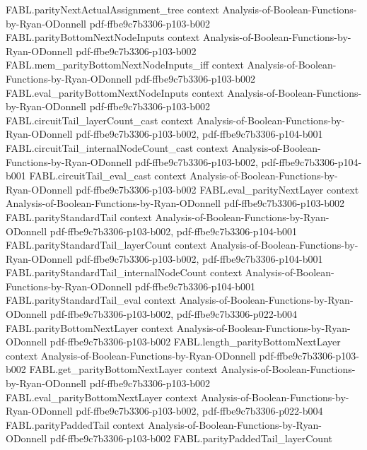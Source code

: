 \begin{theorem}
  {FABL.parityNextActualAssignment_tree}
  {context}
  {Analysis-of-Boolean-Functions-by-Ryan-ODonnell}
  {pdf-ffbe9c7b3306-p103-b002}
\proofstep
  {FABL.parityBottomNextNodeInputs}
  {context}
  {Analysis-of-Boolean-Functions-by-Ryan-ODonnell}
  {pdf-ffbe9c7b3306-p103-b002}
\proofstep
  {FABL.mem_parityBottomNextNodeInputs_iff}
  {context}
  {Analysis-of-Boolean-Functions-by-Ryan-ODonnell}
  {pdf-ffbe9c7b3306-p103-b002}
\proofstep
  {FABL.eval_parityBottomNextNodeInputs}
  {context}
  {Analysis-of-Boolean-Functions-by-Ryan-ODonnell}
  {pdf-ffbe9c7b3306-p103-b002}
\proofstep
  {FABL.circuitTail_layerCount_cast}
  {context}
  {Analysis-of-Boolean-Functions-by-Ryan-ODonnell}
  {pdf-ffbe9c7b3306-p103-b002,
    pdf-ffbe9c7b3306-p104-b001}
\proofstep
  {FABL.circuitTail_internalNodeCount_cast}
  {context}
  {Analysis-of-Boolean-Functions-by-Ryan-ODonnell}
  {pdf-ffbe9c7b3306-p103-b002,
    pdf-ffbe9c7b3306-p104-b001}
\proofstep
  {FABL.circuitTail_eval_cast}
  {context}
  {Analysis-of-Boolean-Functions-by-Ryan-ODonnell}
  {pdf-ffbe9c7b3306-p103-b002}
\proofstep
  {FABL.eval_parityNextLayer}
  {context}
  {Analysis-of-Boolean-Functions-by-Ryan-ODonnell}
  {pdf-ffbe9c7b3306-p103-b002}
\proofstep
  {FABL.parityStandardTail}
  {context}
  {Analysis-of-Boolean-Functions-by-Ryan-ODonnell}
  {pdf-ffbe9c7b3306-p103-b002,
    pdf-ffbe9c7b3306-p104-b001}
\proofstep
  {FABL.parityStandardTail_layerCount}
  {context}
  {Analysis-of-Boolean-Functions-by-Ryan-ODonnell}
  {pdf-ffbe9c7b3306-p103-b002,
    pdf-ffbe9c7b3306-p104-b001}
\proofstep
  {FABL.parityStandardTail_internalNodeCount}
  {context}
  {Analysis-of-Boolean-Functions-by-Ryan-ODonnell}
  {pdf-ffbe9c7b3306-p104-b001}
\proofstep
  {FABL.parityStandardTail_eval}
  {context}
  {Analysis-of-Boolean-Functions-by-Ryan-ODonnell}
  {pdf-ffbe9c7b3306-p103-b002,
    pdf-ffbe9c7b3306-p022-b004}
\proofstep
  {FABL.parityBottomNextLayer}
  {context}
  {Analysis-of-Boolean-Functions-by-Ryan-ODonnell}
  {pdf-ffbe9c7b3306-p103-b002}
\proofstep
  {FABL.length_parityBottomNextLayer}
  {context}
  {Analysis-of-Boolean-Functions-by-Ryan-ODonnell}
  {pdf-ffbe9c7b3306-p103-b002}
\proofstep
  {FABL.get_parityBottomNextLayer}
  {context}
  {Analysis-of-Boolean-Functions-by-Ryan-ODonnell}
  {pdf-ffbe9c7b3306-p103-b002}
\proofstep
  {FABL.eval_parityBottomNextLayer}
  {context}
  {Analysis-of-Boolean-Functions-by-Ryan-ODonnell}
  {pdf-ffbe9c7b3306-p103-b002,
    pdf-ffbe9c7b3306-p022-b004}
\proofstep
  {FABL.parityPaddedTail}
  {context}
  {Analysis-of-Boolean-Functions-by-Ryan-ODonnell}
  {pdf-ffbe9c7b3306-p103-b002}
\proofstep
  {FABL.parityPaddedTail_layerCount}

\end{theorem}
